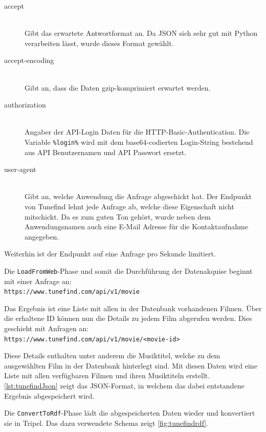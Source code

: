 \documentclass[parskip]{scrartcl}
\begin{document}
\begin{description}
    \item[accept] \hfill \\
        Gibt das erwartete Antwortformat an. Da JSON sich sehr gut mit Python verarbeiten lässt, wurde dieses Format gewählt.
    \item[accept-encoding] \hfill \\
        Gibt an, dass die Daten gzip-komprimiert erwartet werden.
    \item[authorization] \hfill \\
        Angaber der API-Login Daten für die HTTP-Basic-Authentication.
        Die Variable \texttt{\%login\%} wird mit dem base64-codierten Login-String bestehend aus API Benutzernamen und API Passwort ersetzt.
    \item[user-agent] \hfill \\
        Gibt an, welche Anwendung die Anfrage abgeschickt hat. Der Endpunkt von Tunefind lehnt jede Anfrage ab, welche diese Eigenschaft nicht mitschickt. Da es zum guten Ton gehört, wurde neben dem Anwendungsnamen auch eine E-Mail Adresse für die Kontaktaufnahme angegeben.
\end{description}

Weiterhin ist der Endpunkt auf eine Anfrage pro Sekunde limitiert.

Die \texttt{LoadFromWeb}-Phase und somit die Durchführung der Datenakquise beginnt mit einer Anfrage an:\\
\texttt{https://www.tunefind.com/api/v1/movie}

Das Ergebnis ist eine Liste mit allen in der Datenbank vorhandenen Filmen. Über die erhaltene ID können nun die Details zu jedem Film abgerufen werden. Dies geschieht mit Anfragen an:\\
\texttt{https://www.tunefind.com/api/v1/movie/<movie-id>}

Diese Details enthalten unter anderem die Musiktitel, welche zu dem ausgewählten Film in der Datenbank hinterlegt sind.
Mit diesen Daten wird eine Liste mit allen verfügbaren Filmen und ihren Musiktiteln erstellt. \autoref{lst:tunefindJson} zeigt das JSON-Format, in welchem das dabei entstandene Ergebnis abgespeichert wird.

Die \texttt{ConvertToRdf}-Phase lädt die abgespeicherten Daten wieder und konvertiert sie in Tripel. Das dazu verwendete Schema zeigt \autoref{fig:tunefindrdf}.
\end{document}
